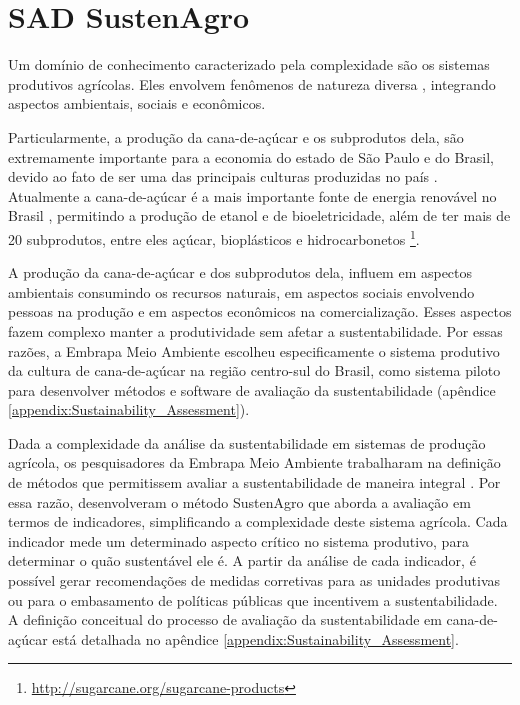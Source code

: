 \section{SAD SustenAgro\label{sec:SAD-SustenAgro}}

Um domínio de conhecimento caracterizado pela complexidade são os
sistemas produtivos agrícolas. Eles envolvem fenômenos de natureza
diversa \citep{simon1991architecture}, integrando aspectos ambientais,
sociais e econômicos.

Particularmente, a produção da cana-de-açúcar e os subprodutos dela,
são extremamente importante para a economia do estado de São Paulo
e do Brasil, devido ao fato de ser uma das principais culturas produzidas
no país \citep{Storquato2015}. Atualmente a cana-de-açúcar é a mais
importante fonte de energia renovável no Brasil \citep{seabra2011life},
permitindo a produção de etanol e de bioeletricidade, além de ter
mais de 20 subprodutos, entre eles açúcar, bioplásticos e hidrocarbonetos
\footnote{\url{http://sugarcane.org/sugarcane-products}}. 

A produção da cana-de-açúcar e dos subprodutos dela, influem em aspectos
ambientais consumindo os recursos naturais, em aspectos sociais envolvendo
pessoas na produção e em aspectos econômicos na comercialização. Esses
aspectos fazem complexo manter a produtividade sem afetar a sustentabilidade.
Por essas razões, a Embrapa Meio Ambiente escolheu especificamente
o sistema produtivo da cultura de cana-de-açúcar na região centro-sul
do Brasil, como sistema piloto para desenvolver métodos e software
de avaliação da sustentabilidade (apêndice \ref{appendix:Sustainability_Assessment}).

Dada a complexidade da análise da sustentabilidade em sistemas de
produção agrícola, os pesquisadores da Embrapa Meio Ambiente trabalharam
na definição de métodos que permitissem avaliar a sustentabilidade
de maneira integral \citep{Singh2012281}. Por essa razão, desenvolveram
o método SustenAgro que aborda a avaliação em termos de indicadores,
simplificando a complexidade deste sistema agrícola. Cada indicador
mede um determinado aspecto crítico no sistema produtivo, para determinar
o quão sustentável ele é. A partir da análise de cada indicador, é
possível gerar recomendações de medidas corretivas para as unidades
produtivas ou para o embasamento de políticas públicas que incentivem
a sustentabilidade. A definição conceitual do processo de avaliação
da sustentabilidade em cana-de-açúcar está detalhada no apêndice \ref{appendix:Sustainability_Assessment}. 

